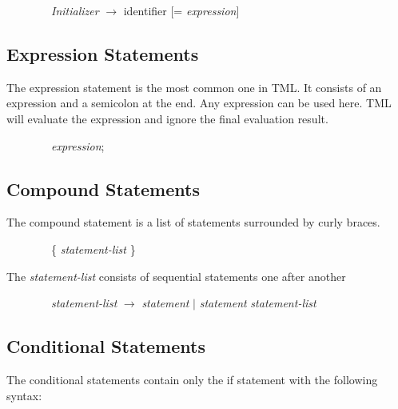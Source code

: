 \documentclass[12pt,psfig,a4]{article}
\begin{document}
\begin{code}
\begin{tabbing}
~~~~~~~~\textsl{Initializer} $\rightarrow$ identifier [= \textsl{expression}]
\end{tabbing}
\end{code}

\subsection{Expression Statements}
The expression statement is the most common one in TML. It consists of an expression and a semicolon at the end. Any expression can be used here. TML will evaluate the expression and ignore the final evaluation result.

\begin{code}
\begin{tabbing}
~~~~~~~~\textsl{expression};
\end{tabbing}
\end{code}

\subsection{Compound Statements}
The compound statement is a list of statements surrounded by curly braces.

\begin{code}
\begin{tabbing}
~~~~~~~~\{ \textsl{statement-list}
\}
\end{tabbing}
\end{code}

The \textsl{statement-list} consists of sequential statements one after another

\begin{code}
\begin{tabbing}
~~~~~~~~\textsl{statement-list}  $\rightarrow$ \textsl{statement} $\mid$ \textsl{statement} \textsl{statement-list}
\end{tabbing}
\end{code}

\subsection{Conditional Statements}
The conditional statements contain only the if statement with the following syntax:
\end{document}
